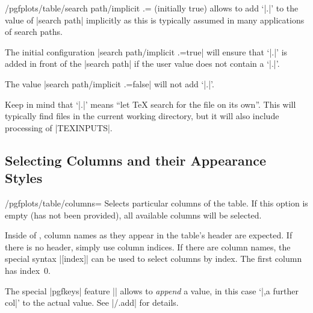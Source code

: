 \begin{key}{/pgfplots/table/search path/implicit .= (initially true)}
    \PGFPlotstable{} allows to add `|.|' to the value of |search path|
    implicitly as this is typically assumed in many applications of search
    paths.

    The initial configuration |search path/implicit .=true| will ensure that
    `|.|' is added in front of the |search path| if the user value does not
    contain a `|.|'.

    The value |search path/implicit .=false| will not add `|.|'.

    Keep in mind that `|.|' means ``let \TeX{} search for the file on its
    own''. This will typically find files in the current working directory, but
    it will also include processing of |TEXINPUTS|.
\end{key}


\subsection{Selecting Columns and their Appearance Styles}

\begin{key}{/pgfplots/table/columns=}
    Selects particular columns of the table. If this option is empty (has not
    been provided), all available columns will be selected.

    Inside of , column names as they appear in the
    table's header are expected. If there is no header, simply use column
    indices. If there are column names, the special syntax
    |[index]| can be used to select columns by index. The first
    column has index~$0$.
\begin{codeexample}[pre={\begin{lateximage}},post={\end{lateximage}}]
\end{codeexample}

    The special |pgfkeys| feature
    || allows to
    \emph{append} a value, in this case `|,a further col|' to the actual value.
    See |/.add| for details.
\end{key}

